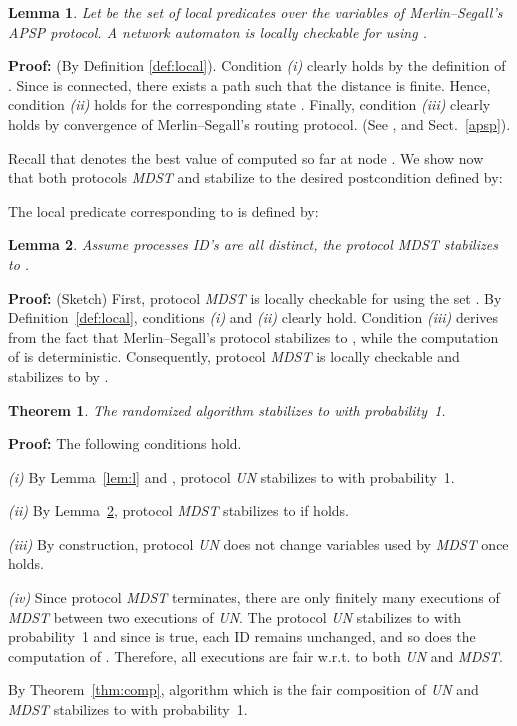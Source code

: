 \documentclass[10pt]{article}
\newtheorem{thm}{Theorem}[section]
\newtheorem{lemm}{Lemma}[section]
\newenvironment{proof}{\begin{trivlist}
                       \item[]\hspace{0cm}\textbf{Proof: }
                       \hspace{0cm} }{\hfill 
                       \end{trivlist}}
\begin{document}
\begin{lemm}\label{lem:l'}
Let  be the set of local predicates over the variables
of Merlin--Segall's APSP protocol.
A network automaton  is locally checkable for  using .
\end{lemm}

\begin{proof}
(By Definition \ref{def:local}).
Condition {\em (i)} clearly holds by the definition of .
Since  is connected, there exists a path  such that the
distance  is finite. Hence, condition {\em (ii)} holds
for the corresponding state .
Finally, condition {\em (iii)} clearly holds by convergence
of Merlin--Segall's routing protocol. (See \cite[Property~(c)]{MeSe79}, and
Sect.~\ref{apsp}).
\end{proof}
Recall that  denotes the best value of 
computed so far at node . We show now that both protocols {\em MDST} and  stabilize to the
desired postcondition  defined by:

The local predicate  corresponding to  is defined by:


\begin{lemm}\label{lem:mdst-stab}
Assume processes ID's are all distinct, the protocol MDST stabilizes to
.
\end{lemm}

\begin{proof} (Sketch) First, protocol {\em MDST} is locally checkable for
 using the set .
By Definition~\ref{def:local}, conditions {\em (i)} and {\em (ii)} clearly
hold.
Condition {\em (iii)} derives from the fact that Merlin--Segall's
protocol stabilizes to , while the computation of  is
deterministic. Consequently, protocol {\em MDST} is locally checkable
and stabilizes to  by \cite[Theorem~10]{APVD94}.
\end{proof}

\begin{thm}\label{thm:algostab}
The randomized algorithm  stabilizes to  with probability~1.
\end{thm}

\begin{proof} The following conditions hold.

{\em (i)} By Lemma~\ref{lem:l} and \cite[Theorem~10]{APVD94},
protocol {\em UN} stabilizes to  with probability~1.

{\em (ii)} By Lemma~\ref{lem:mdst-stab},
protocol {\em MDST} stabilizes to  if  holds.

{\em (iii)} By construction,
protocol {\em UN} does not change variables used by {\em MDST}
once  holds.

{\em (iv)} Since protocol {\em MDST} terminates,
there are only finitely many executions of {\em MDST} between two
executions of {\em UN}. The protocol {\em UN} stabilizes to
 with probability~1
and since  is true, each ID remains unchanged,
and so does the computation of . Therefore,
all executions are fair w.r.t. to both {\em UN} and {\em MDST}.

By Theorem~\ref{thm:comp}, algorithm  which is the
fair composition of {\em UN} and {\em MDST} stabilizes to 
with probability~1.
\end{proof}
\end{document}
